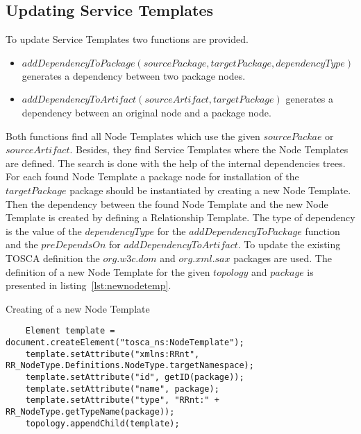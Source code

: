 \subsection*{Updating Service Templates}
To update Service Templates two functions are provided.
\begin{itemize}
	\item $addDependencyToPackage(sourcePackage, targetPackage, dependencyType)$ generates a dependency between two package nodes.
	\item $addDependencyToArtifact(sourceArtifact, targetPackage)$ generates a dependency between an original node and a package node.
\end{itemize} 
Both functions find all Node Templates which use the given $sourcePackae$ or $sourceArtifact$.
Besides, they find Service Templates where the Node Templates are defined.
The search is done with the help of the internal dependencies trees.
For each found Node Template a package node for installation of the $targetPackage$ package should be instantiated by creating a new Node Template.
Then the dependency between the found Node Template and the new Node Template is created by defining a Relationship Template.
The type of dependency is the value of the $dependencyType$ for the $addDependencyToPackage$ function and the $preDependsOn$ for $addDependencyToArtifact$. %
To update the existing TOSCA definition the $org$.$w3c$.$dom$ and $org$.$xml$.$sax$ packages are used. 
The definition of a new Node Template for the given $topology$ and $package$ is presented in listing~\ref{lst:newnodetemp}.
\begin{Listing}
	\caption{Creating of a new Node Template}
	\label{lst:newnodetemp}
	\begin{lstlisting}  
	Element template = document.createElement("tosca_ns:NodeTemplate");
	template.setAttribute("xmlns:RRnt", RR_NodeType.Definitions.NodeType.targetNamespace);
	template.setAttribute("id", getID(package));
	template.setAttribute("name", package);
	template.setAttribute("type", "RRnt:" + RR_NodeType.getTypeName(package));
	topology.appendChild(template);
	\end{lstlisting}
\end{Listing}
